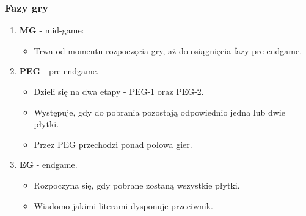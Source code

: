 \documentclass[10pt,a4paper]{beamer}
\begin{document}
\begin{frame}
	\frametitle{Fazy gry}
	
	\begin{enumerate}
		\item \textbf{MG} - mid-game:
			\begin{itemize}
				\item Trwa od momentu rozpoczęcia gry, aż do osiągnięcia fazy pre-endgame.
			\end{itemize}
		\item \textbf{PEG} - pre-endgame.
			\begin{itemize}
				\item Dzieli się na dwa etapy - PEG-1 oraz PEG-2.
				\item Występuje, gdy do pobrania pozostają odpowiednio jedna lub dwie płytki.
				\item Przez PEG przechodzi ponad połowa gier.
			\end{itemize}
		\item \textbf{EG} - endgame.
			\begin{itemize}
				\item Rozpoczyna się, gdy pobrane zostaną wszystkie płytki.
				\item Wiadomo jakimi literami dysponuje przeciwnik.
			\end{itemize}
	\end{enumerate}
\end{frame}
\end{document}
